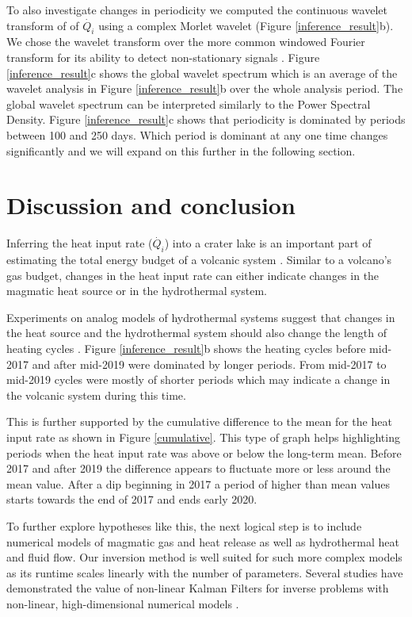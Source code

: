 \documentclass[doublespacing]{bmcart}
\begin{document}
To also investigate changes in periodicity we computed the continuous wavelet
transform of of $\dot{Q_i}$ using a complex Morlet wavelet (Figure
\ref{inference_result}b). We chose the wavelet transform over the more common
windowed Fourier transform for its ability to detect non-stationary signals
\cite{torrencePracticalGuideWavelet1998}. Figure \ref{inference_result}c shows
the global wavelet spectrum which is an average of the wavelet analysis in
Figure \ref{inference_result}b over the whole analysis period. The global
wavelet spectrum can be interpreted similarly to the Power Spectral Density.
Figure \ref{inference_result}c shows that periodicity is dominated by periods
between 100 and 250 days. Which period is dominant at any one time changes
significantly and we will expand on this further in the following section.  

\section{Discussion and conclusion}
Inferring the heat input rate ($\dot{Q_i}$) into a crater lake is an important
part of estimating the total energy budget of a volcanic system
\cite{Brown1989a}. Similar to a volcano's gas budget, changes in the heat input
rate can either indicate changes in the magmatic heat source or in the
hydrothermal system.

Experiments on analog models of hydrothermal systems suggest that
changes in the heat source and the hydrothermal system should also change the
length of heating cycles
\cite{vandemeulebrouckAnalogueModelingInstabilities2005,fitzgeraldStabilityTwoPhaseGeothermal1997}.
Figure \ref{inference_result}b shows the heating cycles before mid-2017 and
after mid-2019 were dominated by longer periods. From mid-2017 to mid-2019
cycles were mostly of shorter periods which may indicate a change in the
volcanic system during this time. 

This is further supported by the cumulative difference to the mean for the heat
input rate as shown in Figure \ref{cumulative}. This type of graph helps
highlighting periods when the heat input rate was above or below the long-term
mean. Before 2017 and after 2019 the difference appears to fluctuate more or
less around the mean value. After a dip beginning in 2017 a period of higher
than mean values starts towards the end of 2017 and ends early 2020. 

To further explore hypotheses like this, the next logical step is to include
numerical models of magmatic gas and heat release as well as hydrothermal heat
and fluid flow. Our inversion method is well suited for such more complex models
as its runtime scales linearly with the number of parameters. Several studies
have demonstrated the value of non-linear Kalman Filters for inverse problems
with non-linear, high-dimensional numerical models
\cite[e.g.][]{White2018a,huangIteratedKalmanMethodology2022}. 
\end{document}
